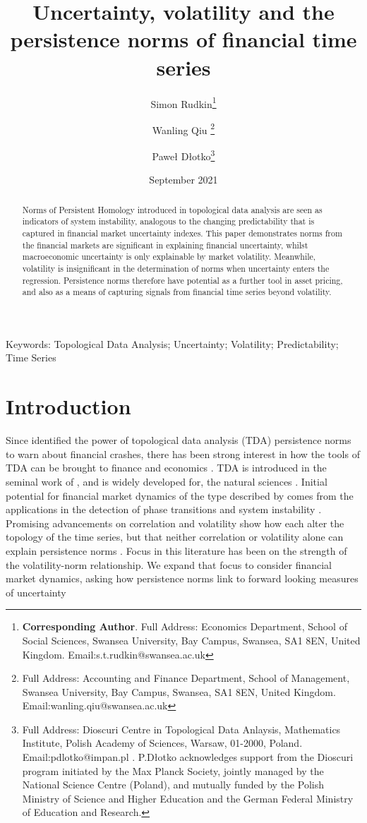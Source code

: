 \documentclass{article}
\title{Uncertainty, volatility and the persistence norms of financial time series}
\author[1]{Simon Rudkin\thanks{\textbf{Corresponding Author}. Full Address: Economics Department, School of Social Sciences, Swansea University, Bay Campus, Swansea, SA1 8EN, United Kingdom. Email:s.t.rudkin@swansea.ac.uk}}
\affil[1]{Economics Department, Swansea University, United Kingdom}
\author[2]{Wanling Qiu \thanks{Full Address: Accounting and Finance Department, School of Management, Swansea University, Bay Campus, Swansea, SA1 8EN, United Kingdom. Email:wanling.qiu@swansea.ac.uk}}
\affil[2]{Accounting and Finance Department, Swansea University, United Kingdom}
\author[1]{Pawe{\l} D{\l}otko\thanks{Full Address: Dioscuri Centre in Topological Data Anlaysis, Mathematics Institute, Polish Academy of Sciences, Warsaw, 01-2000, Poland. Email:pdlotko@impan.pl . P.D{\l}otko acknowledges support from 
the Dioscuri program initiated by the Max Planck Society, jointly managed by the National Science Centre (Poland), and mutually funded by the Polish Ministry of Science and Higher Education and the German Federal Ministry of Education and Research.}}
\affil[1]{Dioscuri Centre in Topological Data Analysis, Polish Academy of Sciences, Poland}
\date{September 2021}
\begin{document}
\maketitle
\begin{abstract}
    Norms of Persistent Homology introduced in topological data analysis are seen as indicators of system instability, analogous to the changing predictability that is captured in financial market uncertainty indexes. This paper demonstrates norms from the financial markets are significant in explaining financial uncertainty, whilst macroeconomic uncertainty is only explainable by market volatility. Meanwhile, volatility is insignificant in the determination of norms when uncertainty enters the regression. Persistence norms therefore have potential as a further tool in asset pricing, and also as a means of capturing signals from financial time series beyond volatility.
\end{abstract}
Keywords: Topological Data Analysis; Uncertainty; Volatility; Predictability; Time Series
\vspace{-10pt}

\section{Introduction}

Since \cite{gidea2018topological} identified the power of topological data analysis (TDA) persistence norms to warn about financial crashes, there has been strong interest in how the tools of TDA can be brought to finance and economics \citep{goel2020topological,bakas2020commodity,gidea2020topological,majumdar2020clustering}. TDA is introduced in the seminal work of \cite{carlsson2009topology}, and is widely developed for, the natural sciences \citep{bubenik2017persistence,bubenik2020persistence}. Initial potential for financial market dynamics of the type described by \cite{hsieh1991chaos} comes from the applications in the detection of phase transitions and system instability \citep{stolz2017persistent,smith2021topological}. Promising advancements on correlation and volatility show how each alter the topology of the time series, but that neither correlation or volatility alone can explain persistence norms \citep{aromi2021topological,leaverton2020some,katz2021time}. Focus in this literature has been on the strength of the volatility-norm relationship. We expand that focus to consider financial market dynamics, asking how persistence norms link to forward looking measures of uncertainty
\end{document}
